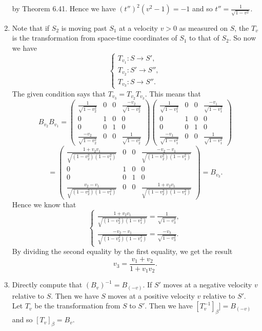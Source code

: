 \begin{enumerate}
by Theorem 6.41. Hence we have $(t'')^2(v^2-1)=-1$ and so $t''=\frac{1}{\sqrt{1-v^2}}$.
\item Note that if $S_2$ is moving past $S_1$ at a velocity $v>0$ as measured on $S$, the $T_v$ is the transformation from space-time coordinates of $S_1$ to that of $S_2$. So now we have 
\[\left\{\begin{array}{l}T_{v_1}:S\rightarrow S',\\T_{v_2}:S'\rightarrow S'',\\T_{v_3}:S\rightarrow S''.\end{array}\right.\]
The given condition says that $T_{v_3}=T_{v_2}T_{v_3}$. This means that 
\[B_{v_2}B_{v_1}=\begin{pmatrix}\frac{1}{\sqrt{1-v_2^2}}&0&0&\frac{-v_2}{\sqrt{1-v_2^2}}\\0&1&0&0\\0&0&1&0\\\frac{-v_2}{\sqrt{1-v_2^2}}&0&0&\frac{1}{\sqrt{1-v_2^2}}\end{pmatrix}\begin{pmatrix}\frac{1}{\sqrt{1-v_1^2}}&0&0&\frac{-v_1}{\sqrt{1-v_1^2}}\\0&1&0&0\\0&0&1&0\\\frac{-v_1}{\sqrt{1-v_1^2}}&0&0&\frac{1}{\sqrt{1-v_1^2}}\end{pmatrix}\]
\[=\begin{pmatrix}\frac{1+v_2v_1}{\sqrt{(1-v_2^2)(1-v_1^2)}}&0&0&\frac{-v_2-v_1}{\sqrt{(1-v_2^2)(1-v_1^2)}}\\0&1&0&0\\0&0&1&0\\\frac{v_2-v_1}{\sqrt{(1-v_2^2)(1-v_1^2)}}&0&0&\frac{1+v_2v_1}{\sqrt{(1-v_2^2)(1-v_1^2)}}\end{pmatrix}=B_{v_3}.\]
Hence we know that 
\[\left\{\begin{array}{l}\frac{1+v_2v_1}{\sqrt{(1-v_2^2)(1-v_1^2)}}=\frac{1}{\sqrt{1-v_3^2}},\\\frac{-v_2-v_1}{\sqrt{(1-v_2^2)(1-v_1^2)}}=\frac{-v_3}{\sqrt{1-v_3^2}}. \end{array}\right.\]
By dividing the second equality by the first equality, we get the result 
\[v_3=\frac{v_1+v_2}{1+v_1v_2}.\]
\item Directly compute that $(B_v)^{-1}=B_{(-v)}$. If $S'$ moves at a negative velocity $v$ relative to $S$. Then we have $S$ moves at a positive velocity $v$ relative to $S'$. Let $T_v$ be the transformation from $S$ to $S'$. Then we have $[T_v^{-1}]_{\beta}]=B_{(-v)}$ and so $[T_v]_{\beta}=B_v$.

\end{enumerate}
